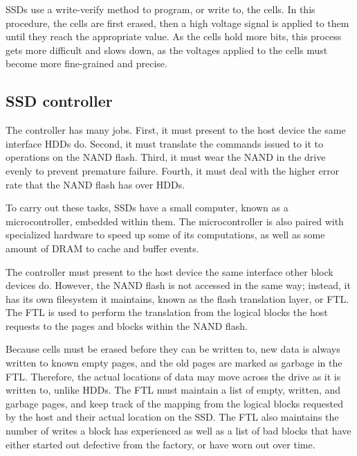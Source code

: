 \documentclass[format=acmsmall, review=false, screen=true]{acmart}
\begin{document}
SSDs use a write-verify method to program, or write to, the cells. In this procedure, the cells are first erased, then 
a high voltage signal is applied to them until they reach the appropriate value. As the cells hold more bits, this 
process gets more difficult and slows down, as the voltages applied to the cells must become more fine-grained and precise.
\cite{Cornwell2012, Micheloni2013}

\subsection{SSD controller}

The controller has many jobs. First, it must present to the host device the same interface HDDs do. Second, it must 
translate the commands issued to it to operations on the NAND flash. Third, it must wear the NAND in the drive evenly 
to prevent premature failure. Fourth, it must deal with the higher error rate that the NAND flash has over HDDs. 
\cite{Cornwell2012, Micheloni2013, MatejFucek2014}

To carry out these tasks, SSDs have a small computer, known as a microcontroller, embedded within them. The microcontroller 
is also paired with specialized hardware to speed up some of its computations, as well as some amount of DRAM to cache and 
buffer events. \cite{Cornwell2012, Micheloni2013, MatejFucek2014}

The controller must present to the host device the same interface other block devices do. However, the NAND flash is not 
accessed in the same way; instead, it has its own filesystem it maintains, known as the flash translation layer, or FTL. 
The FTL is used to perform the translation from the logical blocks the host requests to the pages and blocks within the 
NAND flash. \cite{Cornwell2012, Micheloni2013, MatejFucek2014}

Because cells must be erased before they can be written to, new data is always written to known empty pages, and the old 
pages are marked as garbage in the FTL. Therefore, the actual locations of data may move across the drive as it is written 
to, unlike HDDs. The FTL must maintain a list of empty, written, and garbage pages, and keep track of the mapping from 
the logical blocks requested by the host and their actual location on the SSD. The FTL also maintains the number of writes 
a block has experienced as well as a list of bad blocks that have either started out defective from the factory, or have 
worn out over time. \cite{Cornwell2012, Micheloni2013, MatejFucek2014}
\end{document}
